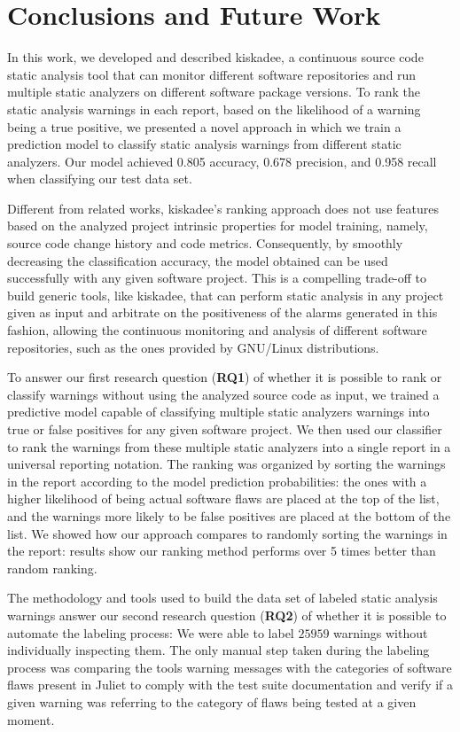\chapter{Conclusions and Future Work}
\label{ch:conclusion}

In this work, we developed and described kiskadee, a continuous source code
static analysis tool that can monitor different software repositories and run
multiple static analyzers on different software package versions. To rank the
static analysis warnings in each report, based on the likelihood of a warning
being a true positive, we presented a novel approach in which we train a
prediction model to classify static analysis warnings from different static
analyzers. Our model achieved 0.805 accuracy, 0.678 precision, and 0.958 recall
when classifying our test data set.

Different from related works, kiskadee's ranking approach does not use features
based on the analyzed project intrinsic properties for model training, namely,
source code change history and code metrics. Consequently, by smoothly
decreasing the classification accuracy, the model obtained can be used
successfully with any given software project. This is a compelling trade-off to
build generic tools, like kiskadee, that can perform static analysis in any
project given as input and arbitrate on the positiveness of the alarms
generated in this fashion, allowing the continuous monitoring and analysis of
different software repositories, such as the ones provided by
GNU/Linux distributions.

To answer our first research question (\textbf{RQ1}) of whether it is possible
to rank or classify warnings without using the analyzed source code as input,
we trained a predictive model capable of classifying multiple static analyzers
warnings into true or false positives for any given software project.  We then
used our classifier to rank the warnings from these multiple static analyzers
into a single report in a universal reporting notation. The ranking was
organized by sorting the warnings in the report according to the model
prediction probabilities: the ones with a higher likelihood of being actual
software flaws are placed at the top of the list, and the warnings more likely
to be false positives are placed at the bottom of the list. We showed how our
approach compares to randomly sorting the warnings in the report: results show
our ranking method performs over 5 times better than random ranking.

The methodology and tools used to build the data set of labeled static analysis
warnings answer our second research question (\textbf{RQ2}) of whether it is
possible to automate the labeling process: We were able to 
label $25959$ warnings without individually inspecting them. The only manual step
taken during the labeling process was comparing the tools warning messages with
the categories of software flaws present in Juliet to comply with the test suite
documentation and verify if a given warning was referring to the category of flaws
being tested at a given moment.

